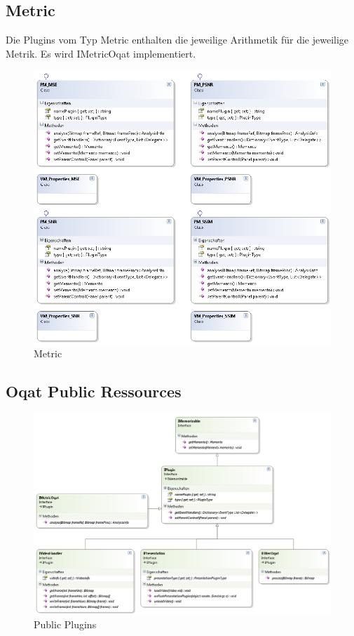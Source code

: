 \pagebreak
\subsection{Metric}
Die Plugins vom Typ Metric enthalten die jeweilige Arithmetik für die jeweilige Metrik. Es wird IMetricOqat implementiert.
\begin{figure}[H]
\noindent\includegraphics[width=\linewidth,height=\textheight,
keepaspectratio]{bilder/Klassendiagramm/Plugins2.png}
\caption{Metric}
\end{figure}

\pagebreak
\subsection{Oqat Public Ressources}
\begin{figure}[H]
\noindent\includegraphics[width=\linewidth,height=\textheight,
keepaspectratio]{bilder/Klassendiagramm/PluginInterfaces.png}
\caption{Public Plugins}
\end{figure}

